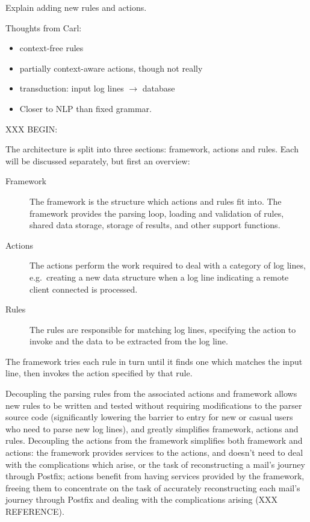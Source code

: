 \documentclass[]{svmult}
\begin{document}
\label{Architecture}

Explain adding new rules and actions.

Thoughts from Carl: 

\begin{itemize}

    \item context-free rules

    \item partially context-aware actions, though not really

    \item transduction: input log lines $\rightarrow$ database

    \item Closer to NLP than fixed grammar.

\end{itemize}

XXX BEGIN\@:

The architecture is split into three sections: framework, actions and
rules.  Each will be discussed separately, but first an overview:

\begin{description}

    \item [Framework]  The framework is the structure which actions and
        rules fit into.  The framework provides the parsing loop, loading
        and validation of rules, shared data storage, storage of results,
        and other support functions.

    \item [Actions]  The actions perform the work required to deal with a
        category of log lines, e.g.\ creating a new data structure when a
        log line indicating a remote client connected is processed.

    \item [Rules]  The rules are responsible for matching log lines,
        specifying the action to invoke and the data to be extracted from
        the log line.

\end{description}

The framework tries each rule in turn until it finds one which matches the
input line, then invokes the action specified by that rule.

Decoupling the parsing rules from the associated actions and framework allows
new rules to be written and tested without requiring modifications to the
parser source code (significantly lowering the barrier to entry for new or
casual users who need to parse new log lines), and greatly simplifies
framework, actions and rules. Decoupling the actions from the
framework simplifies both framework and actions: the framework provides
services to the actions, and doesn't need to deal with the complications which
arise, or the task of reconstructing a mail's journey through Postfix; actions
benefit from having services provided by the framework, freeing them to
concentrate on the task of accurately reconstructing each mail's journey
through Postfix and dealing with the complications arising (XXX REFERENCE).
\end{document}
